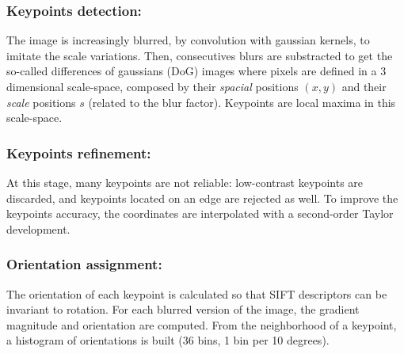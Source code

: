 \documentclass[preprint]{iucr}
\begin{document}
\subsubsection{Keypoints detection:}

The image is increasingly blurred, by convolution with gaussian kernels, to
imitate the scale variations.
Then, consecutives blurs are substracted to get the so-called differences of
gaussians (DoG) images where pixels are defined in a 3 dimensional
scale-space, composed by  their \emph{spacial} positions $(x,y)$ and their
\emph{scale} positions $s$ (related to the blur factor). Keypoints are
local maxima in this scale-space.



\subsubsection{Keypoints refinement:}

At this stage, many keypoints are not reliable: low-contrast keypoints are
discarded, and keypoints located on an edge are rejected as well.  
To improve the keypoints accuracy, the coordinates are interpolated with a
second-order Taylor development. 


\subsubsection{Orientation assignment:}
The orientation of each keypoint is calculated  so that SIFT descriptors
can be invariant to rotation. 
For each blurred version of the image, the gradient magnitude and orientation
are computed. 
From the neighborhood of a keypoint, a histogram of orientations is built (36
bins, 1 bin per 10 degrees). 
\end{document}
